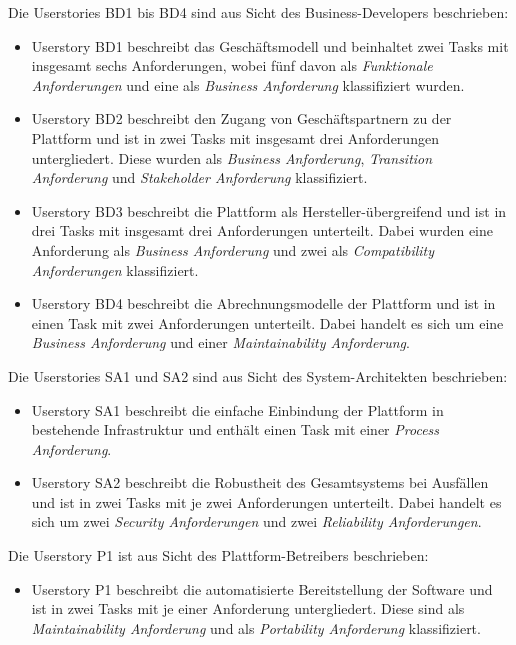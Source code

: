 Die Userstories BD1 bis BD4 sind aus Sicht des Business-Developers beschrieben:
\begin{itemize}
  \item Userstory BD1 beschreibt das Geschäftsmodell und beinhaltet zwei Tasks mit insgesamt sechs Anforderungen, wobei fünf davon als \textit{Funktionale Anforderungen} und eine als \textit{Business Anforderung} klassifiziert wurden.
  \item Userstory BD2 beschreibt den Zugang von Geschäftspartnern zu der Plattform und ist in zwei Tasks mit insgesamt drei Anforderungen untergliedert. Diese wurden als \textit{Business Anforderung}, \textit{Transition Anforderung} und \textit{Stakeholder Anforderung} klassifiziert.
  \item Userstory BD3 beschreibt die Plattform als Hersteller-übergreifend und ist in drei Tasks mit insgesamt drei Anforderungen unterteilt. Dabei wurden eine Anforderung als \textit{Business Anforderung} und zwei als \textit{Compatibility Anforderungen} klassifiziert.
  \item Userstory BD4 beschreibt die Abrechnungsmodelle der Plattform und ist in einen Task mit zwei Anforderungen unterteilt. Dabei handelt es sich um eine \textit{Business Anforderung} und einer \textit{Maintainability Anforderung}.
\end{itemize}

Die Userstories SA1 und SA2 sind aus Sicht des System-Architekten beschrieben:
\begin{itemize}
  \item Userstory SA1 beschreibt die einfache Einbindung der Plattform in bestehende Infrastruktur und enthält einen Task mit einer \textit{Process Anforderung}.
  \item Userstory SA2 beschreibt die Robustheit des Gesamtsystems bei Ausfällen und ist in zwei Tasks mit je zwei Anforderungen unterteilt. Dabei handelt es sich um zwei \textit{Security Anforderungen} und zwei \textit{Reliability Anforderungen}.
\end{itemize}

Die Userstory P1 ist aus Sicht des Plattform-Betreibers beschrieben:
\begin{itemize}
  \item Userstory P1 beschreibt die automatisierte Bereitstellung der Software und ist in zwei Tasks mit je einer Anforderung untergliedert. Diese sind als \textit{Maintainability Anforderung} und als \textit{Portability Anforderung} klassifiziert.
\end{itemize}

